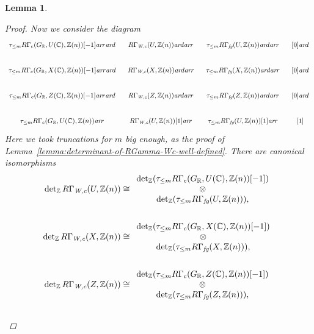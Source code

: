 \documentclass[10pt,a4paper,oneside,draft]{article}
\newcommand{\CC}{\mathbb{C}}
\newcommand{\RR}{\mathbb{R}}
\newcommand{\ZZ}{\mathbb{Z}}
\renewcommand{\det}{\operatorname{det}}
\newcommand{\ar}{\text{\it ar}}
\newcommand{\fg}{\text{\it fg}}
\newcommand{\Wc}{\text{\it W,c}}
\theoremstyle{myplain}
\newtheorem{lemma}[theorem]{Lemma}
\theoremstyle{mydefinition}
\numberwithin{equation}{section}
\begin{document}
\begin{lemma}
\begin{proof}
    Now we consider the diagram
    \[ \begin{tikzcd}[column sep=0.75em,font=\small]
        \tau_{\le m} R\Gamma_c (G_\RR, U (\CC), \ZZ (n))[-1] \ar{r}\ar{d} & R\Gamma_\Wc (U, \ZZ (n))\ar{d}\ar{r} & \tau_{\le m} R\Gamma_\fg (U,\ZZ(n)) \ar{d}\ar{r} & {[0]} \ar{d} \\
        \tau_{\le m} R\Gamma_c (G_\RR, X (\CC), \ZZ (n))[-1] \ar{r}\ar{d} & R\Gamma_\Wc (X, \ZZ (n))\ar{d}\ar{r} & \tau_{\le m} R\Gamma_\fg (X,\ZZ(n)) \ar{d}\ar{r} & {[0]} \ar{d} \\
        \tau_{\le m} R\Gamma_c (G_\RR, Z (\CC), \ZZ (n))[-1] \ar{r}\ar{d} & R\Gamma_\Wc (Z, \ZZ (n))\ar{d}\ar{r} & \tau_{\le m} R\Gamma_\fg (Z,\ZZ(n)) \ar{d}\ar{r} & {[0]} \ar{d} \\
        \tau_{\le m} R\Gamma_c (G_\RR, U (\CC), \ZZ (n)) \ar{r} & R\Gamma_\Wc (U, \ZZ (n)) [1] \ar{r} & \tau_{\le m} R\Gamma_\fg (U,\ZZ(n)) [1] \ar{r} & {[1]}
      \end{tikzcd} \]
    Here we took truncations for $m$ big enough, as the proof of
    Lemma~\ref{lemma:determinant-of-RGamma-Wc-well-defined}. There are canonical
    isomorphisms
    \begin{align*}
      \notag \det_\ZZ R\Gamma_\Wc (U, \ZZ(n)) & \cong \begin{array}{c} \det_\ZZ (\tau_{\le m} R\Gamma_c (G_\RR, U (\CC), \ZZ (n)) [-1]) \\ \otimes \\ \det_\ZZ (\tau_{\le m} R\Gamma_\fg (U, \ZZ(n))), \end{array} \\
      \\
      \notag \det_\ZZ R\Gamma_\Wc (X, \ZZ(n)) & \cong \begin{array}{c} \det_\ZZ (\tau_{\le m} R\Gamma_c (G_\RR, X (\CC), \ZZ (n)) [-1]) \\ \otimes \\ \det_\ZZ (\tau_{\le m} R\Gamma_\fg (X, \ZZ(n))), \end{array} \\
      \\
      \notag \det_\ZZ R\Gamma_\Wc (Z, \ZZ(n)) & \cong \begin{array}{c} \det_\ZZ (\tau_{\le m} R\Gamma_c (G_\RR, Z (\CC), \ZZ (n)) [-1]) \\ \otimes \\ \det_\ZZ (\tau_{\le m} R\Gamma_\fg (Z, \ZZ(n))), \end{array} \\
      \\

\end{align*}
\end{proof}
\end{lemma}
\end{document}
